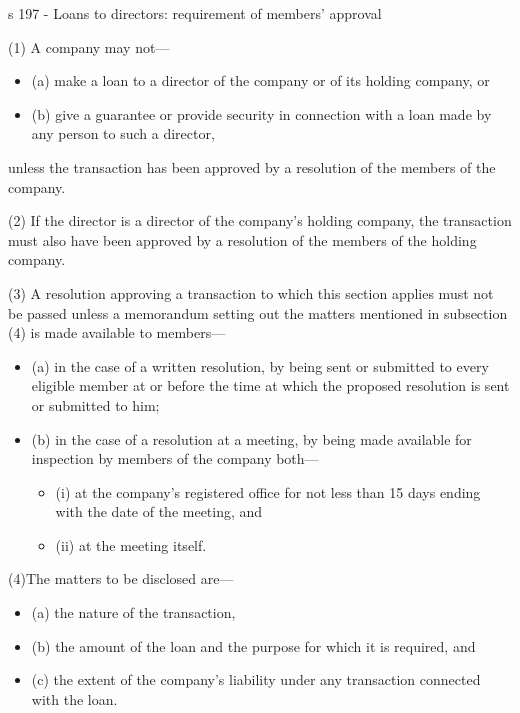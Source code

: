\documentclass[
]{article}
\providecommand{\tightlist}{%
  \setlength{\itemsep}{0pt}\setlength{\parskip}{0pt}}
\newenvironment{env-136e818f-6bd8-45c9-b7d8-e6b8925f9e62}
{
    \savenotes\tcolorbox[blanker,breakable,left=5pt,borderline west={2pt}{-4pt}{green}]
}
{
    \endtcolorbox\spewnotes
}
\begin{document}
\begin{env-136e818f-6bd8-45c9-b7d8-e6b8925f9e62}

s 197 - Loans to directors: requirement of members' approval

(1) A company may not---

\begin{itemize}
\tightlist
\item
  (a) make a loan to a director of the company or of its holding
  company, or
\item
  (b) give a guarantee or provide security in connection with a loan
  made by any person to such a director,
\end{itemize}

unless the transaction has been approved by a resolution of the members
of the company.

(2) If the director is a director of the company's holding company, the
transaction must also have been approved by a resolution of the members
of the holding company.

(3) A resolution approving a transaction to which this section applies
must not be passed unless a memorandum setting out the matters mentioned
in subsection (4) is made available to members---

\begin{itemize}
\tightlist
\item
  (a) in the case of a written resolution, by being sent or submitted to
  every eligible member at or before the time at which the proposed
  resolution is sent or submitted to him;
\item
  (b) in the case of a resolution at a meeting, by being made available
  for inspection by members of the company both---

  \begin{itemize}
  \tightlist
  \item
    (i) at the company's registered office for not less than 15 days
    ending with the date of the meeting, and
  \item
    (ii) at the meeting itself.
  \end{itemize}
\end{itemize}

(4)The matters to be disclosed are---

\begin{itemize}
\tightlist
\item
  (a) the nature of the transaction,
\item
  (b) the amount of the loan and the purpose for which it is required,
  and
\item
  (c) the extent of the company's liability under any transaction
  connected with the loan.
\end{itemize}


\end{env-136e818f-6bd8-45c9-b7d8-e6b8925f9e62}
\end{document}
